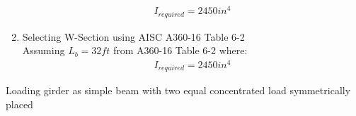 \documentclass{report} %
\begin{document}
\begin{enumerate}
        \begin{equation*}
            \begin{aligned}
                I_{required} = 2450in^4
            \end{aligned}
        \end{equation*}
    \item Selecting W-Section using AISC A360-16 Table 6-2 \\
    Assuming $L_b = 32ft$ from A360-16 Table 6-2 where:
        \begin{equation*}
            \begin{aligned}
                I_{required} = 2450in^4
            \end{aligned}
        \end{equation*}
\end{enumerate}
\begin{center}
\end{center}
Loading girder as simple beam with two equal concentrated load symmetrically placed  

\newpage
\end{document}
